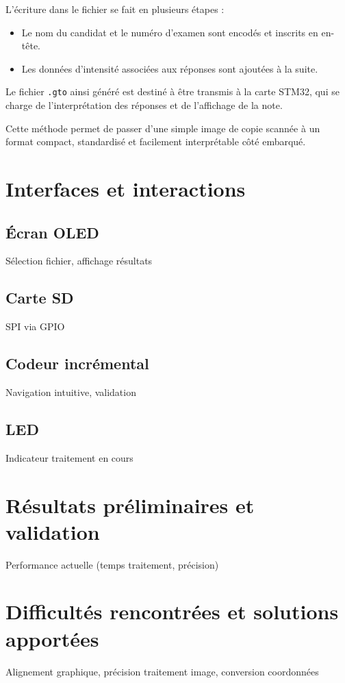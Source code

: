 \documentclass[a4paper,11pt]{article}
\begin{document}
L’écriture dans le fichier se fait en plusieurs étapes :
\begin{itemize}
    \item Le nom du candidat et le numéro d'examen sont encodés et inscrits en en-tête.
    \item Les données d’intensité associées aux réponses sont ajoutées à la suite.
\end{itemize}

Le fichier \texttt{.gto} ainsi généré est destiné à être transmis à la carte STM32, qui se charge de l’interprétation des réponses et de l’affichage de la note.

Cette méthode permet de passer d’une simple image de copie scannée à un format compact, standardisé et facilement interprétable côté embarqué.


\newpage
\section{Interfaces et interactions}

\subsection{Écran OLED}
Sélection fichier, affichage résultats

\subsection{Carte SD}
SPI via GPIO

\subsection{Codeur incrémental}
Navigation intuitive, validation

\subsection{LED}
Indicateur traitement en cours

\section{Résultats préliminaires et validation}
Performance actuelle (temps traitement, précision)

\section{Difficultés rencontrées et solutions apportées}
Alignement graphique, précision traitement image, conversion coordonnées
\end{document}
